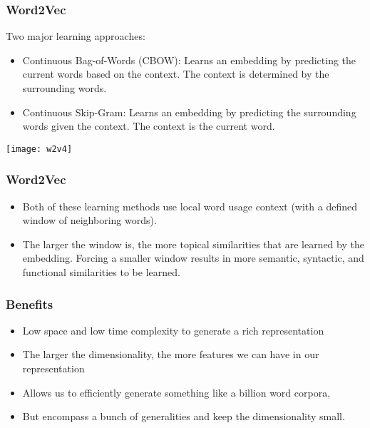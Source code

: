 \begin{frame}[fragile]\frametitle{Word2Vec}
Two major learning approaches:
  \begin{itemize}
    \item Continuous Bag-of-Words (CBOW): Learns an embedding by predicting the current words based on the context. The context is determined by the surrounding words.
	\item Continuous Skip-Gram: Learns an embedding by predicting the surrounding words given the context. The context is the current word.
  \end{itemize}
  
\begin{center}
\texttt{[image: w2v4]}
\end{center}

\end{frame}

\begin{frame}[fragile]\frametitle{Word2Vec}
  \begin{itemize}
    \item Both of these learning methods use local word usage context (with a defined window of neighboring words). 
	\item The larger the window is, the more topical similarities that are learned by the embedding. Forcing a smaller window results in more semantic, syntactic, and functional similarities to be learned.
  \end{itemize}

\end{frame}

\begin{frame}[fragile]\frametitle{Benefits}
  \begin{itemize}
    \item Low space and low time complexity to generate a rich representation
	\item The larger the dimensionality, the more features we can have in our representation
	\item Allows us to efficiently generate something like a billion word corpora, 
	\item But encompass a bunch of generalities and keep the dimensionality small.
  \end{itemize}

\end{frame}

